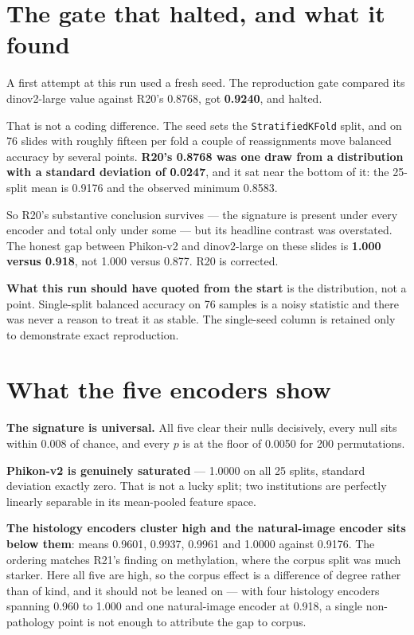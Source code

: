 \documentclass[11pt,a4paper]{article}
\begin{document}
\section{The gate that halted, and what it found}

A first attempt at this run used a fresh seed. The reproduction gate compared its dinov2-large
value against R20's 0.8768, got \textbf{0.9240}, and halted.

That is not a coding difference. The seed sets the \texttt{StratifiedKFold} split, and on 76 slides
with roughly fifteen per fold a couple of reassignments move balanced accuracy by several points.
\textbf{R20's 0.8768 was one draw from a distribution with a standard deviation of 0.0247}, and it
sat near the bottom of it: the 25-split mean is 0.9176 and the observed minimum 0.8583.

So R20's substantive conclusion survives --- the signature is present under every encoder and
total only under some --- but its headline contrast was overstated. The honest gap between
Phikon-v2 and dinov2-large on these slides is \textbf{1.000 versus 0.918}, not 1.000 versus 0.877.
\textcolor{qred}{R20 is corrected.}

\textbf{What this run should have quoted from the start} is the distribution, not a point. Single-split
balanced accuracy on 76 samples is a noisy statistic and there was never a reason to treat it as
stable. The single-seed column is retained only to demonstrate exact reproduction.

\section{What the five encoders show}

\textbf{The signature is universal.} All five clear their nulls decisively, every null sits within
0.008 of chance, and every $p$ is at the floor of 0.0050 for 200 permutations.

\textbf{Phikon-v2 is genuinely saturated} --- 1.0000 on all 25 splits, standard deviation exactly
zero. That is not a lucky split; two institutions are perfectly linearly separable in its
mean-pooled feature space.

\textbf{The histology encoders cluster high and the natural-image encoder sits below them}: means
0.9601, 0.9937, 0.9961 and 1.0000 against 0.9176. The ordering matches R21's finding on methylation,
where the corpus split was much starker. Here all five are high, so the corpus effect is a
difference of degree rather than of kind, and it should not be leaned on --- with four histology
encoders spanning 0.960 to 1.000 and one natural-image encoder at 0.918, a single non-pathology
point is not enough to attribute the gap to corpus.
\end{document}
